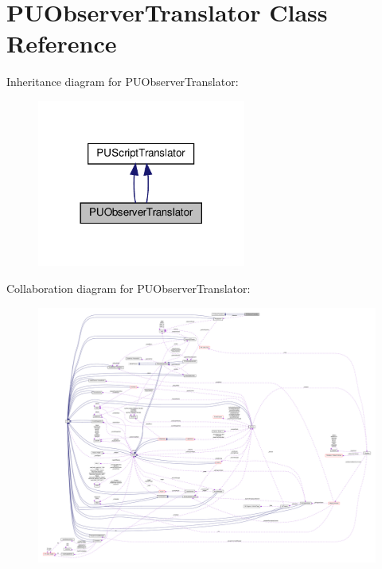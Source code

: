 \hypertarget{classPUObserverTranslator}{}\section{P\+U\+Observer\+Translator Class Reference}
\label{classPUObserverTranslator}


Inheritance diagram for P\+U\+Observer\+Translator\+:
\nopagebreak
\begin{figure}[H]
\begin{center}
\leavevmode
\includegraphics[width=194pt]{classPUObserverTranslator__inherit__graph}
\end{center}
\end{figure}


Collaboration diagram for P\+U\+Observer\+Translator\+:
\nopagebreak
\begin{figure}[H]
\begin{center}
\leavevmode
\includegraphics[width=350pt]{classPUObserverTranslator__coll__graph}
\end{center}
\end{figure}
